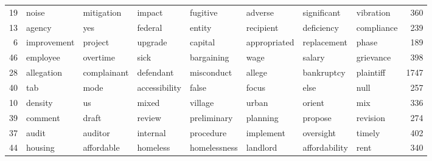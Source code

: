 \begin{table}[ht]
\begin{tabular}{rlllllllr}
   19 & \cellcolor{blue!10}noise & \cellcolor{blue!10}mitigation & \cellcolor{blue!10}impact & \cellcolor{blue!10}fugitive & \cellcolor{blue!10}adverse & \cellcolor{blue!10}significant & \cellcolor{blue!10}vibration & 360 \\ 
   13 & \cellcolor{blue!10}agency & \cellcolor{blue!10}yes & \cellcolor{blue!10}federal & \cellcolor{blue!10}entity & \cellcolor{blue!10}recipient & \cellcolor{blue!10}deficiency & \cellcolor{blue!10}compliance & 239 \\ 
    6 & \cellcolor{blue!10}improvement & \cellcolor{blue!10}project & \cellcolor{blue!10}upgrade & \cellcolor{blue!10}capital & \cellcolor{blue!10}appropriated & \cellcolor{blue!10}replacement & \cellcolor{blue!10}phase & 189 \\ 
   46 & \cellcolor{blue!10}employee & \cellcolor{blue!10}overtime & \cellcolor{blue!10}sick & \cellcolor{blue!10}bargaining & \cellcolor{blue!10}wage & \cellcolor{blue!10}salary & \cellcolor{blue!10}grievance & 398 \\ 
   28 & \cellcolor{blue!10}allegation & \cellcolor{blue!10}complainant & \cellcolor{blue!10}defendant & \cellcolor{blue!10}misconduct & \cellcolor{blue!10}allege & \cellcolor{blue!10}bankruptcy & \cellcolor{blue!10}plaintiff & 1747 \\ 
   40 & \cellcolor{blue!10}tab & \cellcolor{blue!10}mode & \cellcolor{blue!10}accessibility & \cellcolor{blue!10}false & \cellcolor{blue!10}focus & \cellcolor{blue!10}else & \cellcolor{blue!10}null & 257 \\ 
   10 & \cellcolor{blue!10}density & \cellcolor{blue!10}us & \cellcolor{blue!10}mixed & \cellcolor{blue!10}village & \cellcolor{blue!10}urban & \cellcolor{blue!10}orient & \cellcolor{blue!10}mix & 336 \\ 
   39 & \cellcolor{blue!10}comment & \cellcolor{blue!10}draft & \cellcolor{blue!10}review & \cellcolor{blue!10}preliminary & \cellcolor{blue!10}planning & \cellcolor{blue!10}propose & \cellcolor{blue!10}revision & 274 \\ 
   37 & \cellcolor{blue!10}audit & \cellcolor{blue!10}auditor & \cellcolor{blue!10}internal & \cellcolor{blue!10}procedure & \cellcolor{blue!10}implement & \cellcolor{blue!10}oversight & \cellcolor{blue!10}timely & 402 \\ 
   44 & \cellcolor{blue!10}housing & \cellcolor{blue!10}affordable & \cellcolor{blue!10}homeless & \cellcolor{blue!10}homelessness & \cellcolor{blue!10}landlord & \cellcolor{blue!10}affordability & \cellcolor{blue!10}rent & 340 \\ 

\end{tabular}
\end{table}
